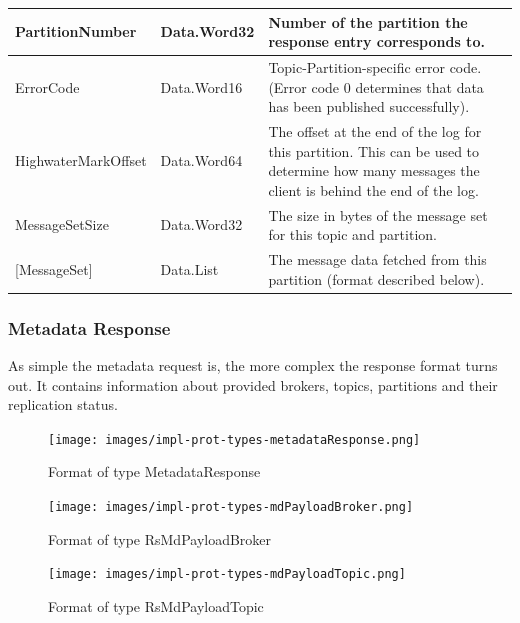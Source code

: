 \begin{table}[H]
\centering
\begin{tabular}{ l  l  p{8cm} }
\hline
PartitionNumber     & Data.Word32 & Number of the partition the response entry corresponds to.                                                                                               \\ \hline
ErrorCode           & Data.Word16 & Topic-Partition-specific error code. (Error
code 0 determines that data has been published successfully).                                                \\ \hline
HighwaterMarkOffset & Data.Word64 & The offset at the end of the log for this
partition. This can be used to determine how many messages the client is behind the end of the log. \\ \hline
MessageSetSize      & Data.Word32 & The size in bytes of the message set for
this topic and partition.                                                                                         \\ \hline
{[}MessageSet{]}    & Data.List   & The message data fetched from this
partition (format described below).                                                                           \\ \hline
\end{tabular}
\end{table}

\subsubsection{Metadata Response}
As simple the metadata request is, the more complex the response format turns
out. It contains information about provided brokers, topics, partitions and
their replication status. 

\begin{figure}[H]
    \centering
    \texttt{[image: images/impl-prot-types-metadataResponse.png]}
    \caption{Format of type MetadataResponse}
\end{figure}

\begin{figure}[H]
    \centering
    \texttt{[image: images/impl-prot-types-mdPayloadBroker.png]}
    \caption{Format of type RsMdPayloadBroker} 
\end{figure}

\begin{figure}[H]
    \centering
    \texttt{[image: images/impl-prot-types-mdPayloadTopic.png]}
    \caption{Format of type RsMdPayloadTopic}
\end{figure}


